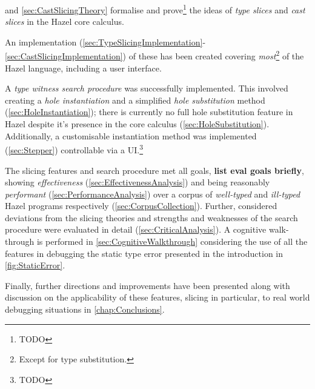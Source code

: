  and \cref{sec:CastSlicingTheory} formalise and prove\footnote{TODO} the ideas of \textit{type slices} and \textit{cast slices} in the Hazel core calculus. 
 
 An implementation (\cref{sec:TypeSlicingImplementation}-\ref{sec:CastSlicingImplementation}) of these has been created covering \textit{most}\footnote{Except for type substitution.} of the Hazel language, including a user interface. 
 
 A \textit{type witness search procedure} was successfully implemented. This involved creating a \textit{hole instantiation} and a simplified \textit{hole substitution} method (\cref{sec:HoleInstantiation}); there is currently no full hole substitution feature in Hazel despite it's presence in the core calculus (\cref{sec:HoleSubstitution}). Additionally, a customisable instantiation method was implemented (\cref{sec:Stepper}) controllable via a UI.\footnote{TODO}

The slicing features and search procedure met all goals, \textbf{list eval goals briefly}, showing \textit{effectiveness} (\cref{sec:EffectivenessAnalysis}) and being reasonably \textit{performant} (\cref{sec:PerformanceAnalysis}) over a corpus of \textit{well-typed} and \textit{ill-typed} Hazel programs respectively (\cref{sec:CorpusCollection}). Further, considered deviations from the slicing theories and strengths and weaknesses of the search procedure were evaluated in detail (\cref{sec:CriticalAnalysis}). A cognitive walk-through is performed in \cref{sec:CognitiveWalkthrough} considering the use of all the features in debugging the static type error presented in the introduction in \cref{fig:StaticError}.

Finally, further directions and improvements have been presented along with discussion on the applicability of these features, slicing in particular, to real world debugging situations in \cref{chap:Conclusions}.